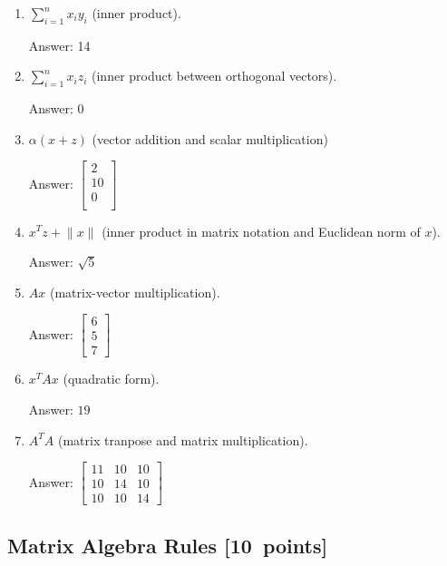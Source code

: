 \documentclass{article}
\newenvironment{answer}{\par\begingroup\color{gre}Answer: }{\endgroup}
\newcommand\pts[1]{\textcolor{pointscolour}{[#1~points]}}
\newcommand{\norm}[1]{\lVert #1 \rVert}
\begin{document}
  \begin{enumerate}
  \item $\sum_{i=1}^n x_iy_i$ (inner product).
  \begin{answer}
    14
  \end{answer}
  \item $\sum_{i=1}^n x_i z_i$ (inner product between orthogonal vectors).
  \begin{answer}
  0
  \end{answer}
  \item $\alpha(x+z)$ (vector addition and scalar multiplication)
  \begin{answer}
  $\left[\begin{array}{c}
       2 \\
       10\\
       0\\
  \end{array}\right]$
  \end{answer} 
  
  \item $x^Tz + \norm{x}$ (inner product in matrix notation and Euclidean norm of $x$).
  \begin{answer}
 $ \sqrt{5}$
  \end{answer}
  \item $Ax$ (matrix-vector multiplication).
  \begin{answer}
   $\left[\begin{array}{c}
       6  \\
       5 \\
       7
  \end{array} \right]$
  \end{answer}
  \item $x^TAx$ (quadratic form).
  \begin{answer}
   $19$
  \end{answer}
  \item $A^TA$ (matrix tranpose and matrix multiplication).
  \begin{answer}
   $\left[ \begin{array}{ccc}
        11 & 10 & 10 \\
        10 & 14 & 10 \\
        10 & 10 & 14 
   \end{array}\right]$
  \end{answer}
  \end{enumerate}

  \subsection{Matrix Algebra Rules \pts{10}}
\end{document}
